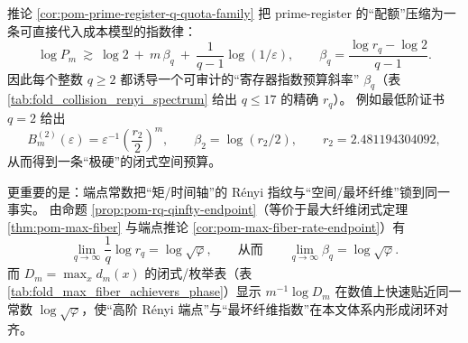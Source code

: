 \begin{remark}\label{rem:pom-betaq-isa}
推论 \ref{cor:pom-prime-register-q-quota-family} 把 prime-register 的“配额”压缩为一条可直接代入成本模型的指数律：
\[
\log P_m\ \gtrsim\ \log 2\ +\ m\,\beta_q\ +\ \frac{1}{q-1}\log(1/\varepsilon),
\qquad
\beta_q=\frac{\log r_q-\log 2}{q-1}.
\]
因此每个整数 \(q\ge 2\) 都诱导一个可审计的“寄存器指数预算斜率” \(\beta_q\)（表 \ref{tab:fold_collision_renyi_spectrum} 给出 \(q\le 17\) 的精确 \(r_q\)）。
例如最低阶证书 \(q=2\) 给出
\[
B_m^{(2)}(\varepsilon)=\varepsilon^{-1}\left(\frac{r_2}{2}\right)^m,
\qquad
\beta_2=\log(r_2/2),
\qquad
r_2=2.481194304092,
\]
从而得到一条“极硬”的闭式空间预算。
\par
更重要的是：端点常数把“矩/时间轴”的 Rényi 指纹与“空间/最坏纤维”锁到同一事实。
由命题 \ref{prop:pom-rq-qinfty-endpoint}（等价于最大纤维闭式定理 \ref{thm:pom-max-fiber} 与端点推论 \ref{cor:pom-max-fiber-rate-endpoint}）有
\[
\lim_{q\to\infty}\frac{1}{q}\log r_q=\log\sqrt{\varphi},
\qquad\text{从而}\qquad
\lim_{q\to\infty}\beta_q=\log\sqrt{\varphi}.
\]
而 \(D_m=\max_x d_m(x)\) 的闭式/枚举表（表 \ref{tab:fold_max_fiber_achievers_phase}）显示
\(
m^{-1}\log D_m
\)
在数值上快速贴近同一常数 \(\log\sqrt{\varphi}\)，使“高阶 Rényi 端点”与“最坏纤维指数”在本文体系内形成闭环对齐。
\end{remark}
